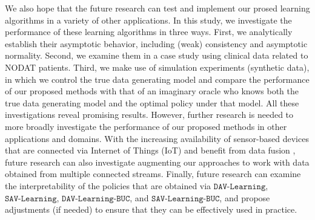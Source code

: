 \documentclass[opre,nonblindrev]{informs2}%
\newcommand{\1}{\hbox{\rm 1\kern-.35em 1}}
\newcommand{\SAV}{\texttt{SAV-Learning}}
\newcommand{\DAV}{\texttt{DAV-Learning}}
\newcommand{\SAVBUC}{\texttt{SAV-Learning-BUC}}
\newcommand{\DAVBUC}{\texttt{DAV-Learning-BUC}}
\begin{document}
We also hope that the future research can test and implement our  prosed learning algorithms in a variety of other applications. In  this study, we investigate the performance of these learning algorithms in three ways.   First, we analytically establish their asymptotic behavior, including (weak) consistency and asymptotic
normality. Second, we examine them in a case study using clinical data related to NODAT patients.  Third, we make use  of simulation experiments (synthetic data), in which we control the true data generating model and compare the performance of our proposed methods with that of an imaginary oracle who knows both the true data generating model and the optimal policy under that model.  All these investigations reveal promising results. However, further research is needed to more broadly investigate the performance of our proposed methods in other applications and domains. With the increasing availability of sensor-based devices that are connected via Internet of Things (IoT) and benefit from data fusion \citep[see, e.g.,][]{SaghafianIoT}, future research can also investigate augmenting our approaches to work with data obtained from multiple connected streams. Finally, future research can examine the interpretability of the policies that are obtained via $\DAV$, $\SAV$, $\DAVBUC$, and $\SAVBUC$, and  propose adjustments (if needed) to ensure that they can be effectively used in practice.






%
%







%
%


\end{document}
